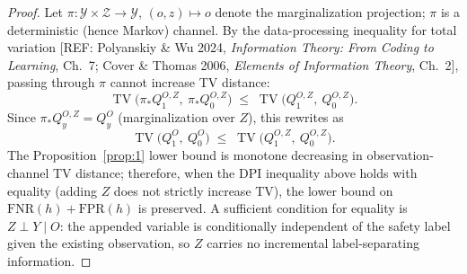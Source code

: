 \documentclass[11pt]{article}
\newcommand{\REF}[1]{{\color{teal}\textsf{[REF: #1]}}}
\theoremstyle{plain}
\theoremstyle{definition}
\DeclareMathOperator{\TV}{TV}
\begin{document}
\begin{proof}
Let $\pi: \mathcal{Y} \times \mathcal{Z} \to \mathcal{Y}$, $(o, z) \mapsto o$ denote the marginalization projection; $\pi$ is a deterministic (hence Markov) channel.
By the data-processing inequality for total variation
\REF{Polyanskiy \& Wu 2024, \emph{Information Theory: From Coding to Learning}, Ch.~7; Cover \& Thomas 2006, \emph{Elements of Information Theory}, Ch.~2},
passing through $\pi$ cannot increase TV distance:
\[
\TV\!\big(\pi_* Q_1^{O,Z},\ \pi_* Q_0^{O,Z}\big)
\;\le\;
\TV\!\big(Q_1^{O,Z},\ Q_0^{O,Z}\big).
\]
Since $\pi_* Q_y^{O,Z} = Q_y^{O}$ (marginalization over $Z$), this rewrites as
\[
\TV\!\big(Q_1^{O},\ Q_0^{O}\big)
\;\le\;
\TV\!\big(Q_1^{O,Z},\ Q_0^{O,Z}\big).
\]
The Proposition~\ref{prop:1} lower bound is monotone decreasing in observation-channel TV distance; therefore, when the DPI inequality above holds with equality (adding $Z$ does not strictly increase TV), the lower bound on $\mathrm{FNR}(h) + \mathrm{FPR}(h)$ is preserved.
A sufficient condition for equality is $Z \perp Y \mid O$: the appended variable is conditionally independent of the safety label given the existing observation, so $Z$ carries no incremental label-separating information.
\end{proof}
\end{document}
